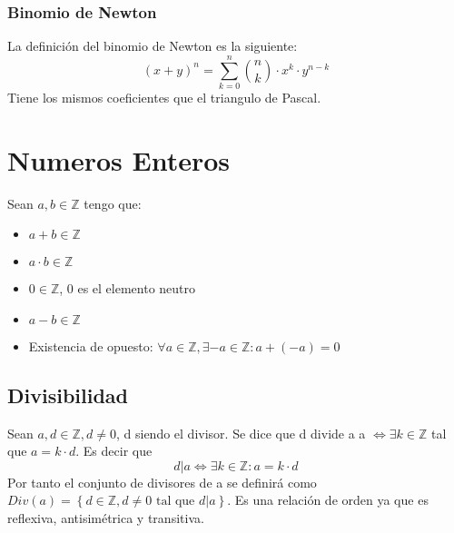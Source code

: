 \documentclass{article}
\begin{document}
\subsubsection{Binomio de Newton}
La definición del binomio de Newton es la siguiente: \begin{equation}
    (x+y)^n = \sum_{k=0}^n \binom{n}{k} \cdot x^k \cdot y^{n-k}
\end{equation}
Tiene los mismos coeficientes que el triangulo de Pascal.

\section{Numeros Enteros}
Sean $a, b \in \mathbb{Z}$ tengo que: \begin{itemize}
    \item $a + b \in \mathbb{Z}$
    \item $a \cdot b \in \mathbb{Z}$
    \item $0 \in \mathbb{Z}$, 0 es el elemento neutro
    \item $a - b \in \mathbb{Z}$
    \item Existencia de opuesto: $\forall a \in \mathbb{Z},\exists -a \in \mathbb{Z}: a + (-a) = 0$
\end{itemize}

\subsection{Divisibilidad}
Sean $a,d \in \mathbb{Z}, d \neq 0$, d siendo el divisor. Se dice que d divide a a $\iff \exists k \in \mathbb{Z}$ tal que $a = k \cdot d$. Es decir que \begin{equation}
    d | a \iff \exists k \in \mathbb{Z}: a = k \cdot d
\end{equation} 
Por tanto el conjunto de divisores de a se definirá como $Div(a) = \left\{d \in \mathbb{Z}, d \neq 0 \text{ tal que } d|a \right\}$. Es una relación de orden ya que es reflexiva, antisimétrica y transitiva.
\end{document}
